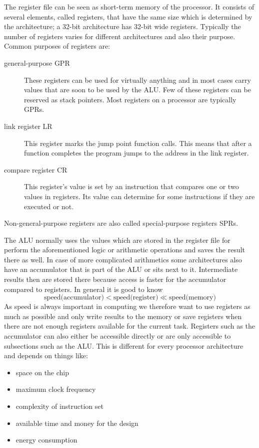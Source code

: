The register file can be seen as short-term memory of the processor.
It consists of several elements, called registers, that have the same size which is determined by the architecture; a 32-bit architecture has 32-bit wide registers.
Typically the number of registers varies for different architectures and also their purpose.
Common purposes of registers are:
\begin{description}
    \item[general-purpose GPR] These registers can be used for virtually anything and in most cases carry values that are soon to be used by the ALU. Few of these registers can be reserved as stack pointers. Most registers on a processor are typically GPRs.
    \item[link register LR] This register marks the jump point function calls. This means that after a function completes the program jumps to the address in the link register.
    \item[compare register CR] This register's value is set by an instruction that compares one or two values in registers. Its value can determine for some instructions if they are executed or not.
\end{description}        
Non-general-purpose registers are also called special-purpose registers SPRs.

The ALU normally uses the values which are stored in the register file for perform the aforementioned logic or arithmetic operations and saves the result there as well.
In case of more complicated arithmetics some architectures also have an accumulator that is part of the ALU or sits next to it.
Intermediate results then are stored there because access is faster for the accumulator compared to registers.
In general it is good to know
\begin{equation}
    \text{speed(accumulator)} < \text{speed(register)} \ll \text{speed(memory)}
\end{equation}
As speed is always important in computing we therefore want to use registers as much as possible and only write results to the memory or save registers when there are not enough registers available for the current task.
Registers such as the accumulator can also either be accessible directly or are only accessible to subsections such as the ALU.
This is different for every processor architecture and depends on things like:
\begin{itemize}
    \item space on the chip
    \item maximum clock frequency
    \item complexity of instruction set
    \item available time and money for the design
    \item energy consumption
\end{itemize}

